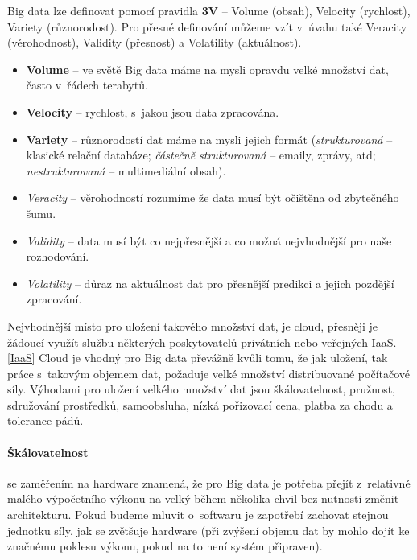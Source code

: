 \par Big data lze definovat pomocí pravidla \textbf{3V} -- Volume (obsah), Velocity (rychlost), Variety (různorodost). Pro přesné definování můžeme vzít v~úvahu také Veracity (věrohodnost), Validity (přesnost) a Volatility (aktuálnost).\cite{big-data-action}
\begin{itemize}
\item \textbf{Volume} -- ve světě Big data máme na mysli opravdu velké množství dat, často v~řádech terabytů.
\item \textbf{Velocity} -- rychlost, s~jakou jsou data zpracována.
\item \textbf{Variety} -- různorodostí dat máme na mysli jejich formát (\textit{strukturovaná} -- klasické relační databáze; \textit{částečně strukturovaná} -- emaily, zprávy, atd; \textit{nestrukturovaná} -- multimediální obsah).
\item \textit{Veracity} -- věrohodností rozumíme že data musí být očištěna od zbytečného šumu.
\item \textit{Validity} -- data musí být co nejpřesnější a co možná nejvhodnější pro naše rozhodování.
\item \textit{Volatility} -- důraz na aktuálnost dat pro přesnější predikci a jejich pozdější zpracování. \cite{big-data-action}
\end{itemize}

Nejvhodnější místo pro uložení takového množství dat, je cloud, přesněji je žádoucí využít službu některých poskytovatelů privátních nebo veřejných IaaS. \ref{IaaS} Cloud je vhodný pro Big data převážně kvůli tomu, že jak uložení, tak práce s~takovým objemem dat, požaduje velké množství distribuované počítačové síly. Výhodami pro uložení velkého množství dat jsou škálovatelnost, pružnost, sdružování prostředků, samoobsluha, nízká pořizovací cena, platba za chodu a tolerance pádů. \cite{big-data-dummies}

\paragraph{Škálovatelnost} se zaměřením na hardware znamená, že pro Big data je potřeba přejít z~relativně malého výpočetního výkonu na velký během několika chvil bez nutnosti změnit architekturu. Pokud budeme mluvit o~softwaru je zapotřebí zachovat stejnou jednotku síly, jak se zvětšuje hardware (při zvýšení objemu dat by mohlo dojít ke značnému poklesu výkonu, pokud na to není systém připraven). \cite{big-data-dummies}

